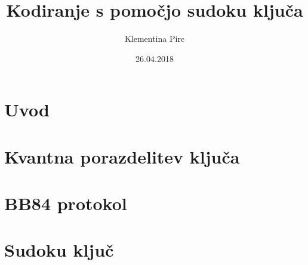 \documentclass[A4paper, 11pt]{article}
\title{Kodiranje s pomočjo sudoku ključa}
\author{Klementina Pirc}
\date{26.04.2018}
\begin{document}
\maketitle

\section{Uvod}

\section{Kvantna porazdelitev ključa}

\section{BB84 protokol}

\section{Sudoku ključ}
\end{document}
